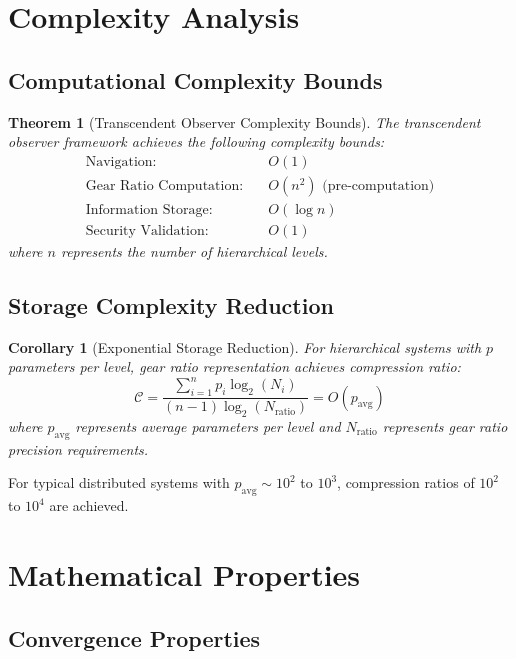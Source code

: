 \documentclass[12pt,a4paper]{article}
\newtheorem{theorem}{Theorem}
\newtheorem{corollary}{Corollary}
\begin{document}
\section{Complexity Analysis}

\subsection{Computational Complexity Bounds}

\begin{theorem}[Transcendent Observer Complexity Bounds]
The transcendent observer framework achieves the following complexity bounds:
\begin{align}
\text{Navigation}: &\quad O(1) \\
\text{Gear Ratio Computation}: &\quad O(n^2) \text{ (pre-computation)} \\
\text{Information Storage}: &\quad O(\log n) \\
\text{Security Validation}: &\quad O(1)
\end{align}
where $n$ represents the number of hierarchical levels.
\end{theorem}

\subsection{Storage Complexity Reduction}

\begin{corollary}[Exponential Storage Reduction]
For hierarchical systems with $p$ parameters per level, gear ratio representation achieves compression ratio:
\begin{equation}
\mathcal{C} = \frac{\sum_{i=1}^{n} p_i \log_2(N_i)}{(n-1) \log_2(N_{\text{ratio}})} = O(p_{\text{avg}})
\end{equation}
where $p_{\text{avg}}$ represents average parameters per level and $N_{\text{ratio}}$ represents gear ratio precision requirements.
\end{corollary}

For typical distributed systems with $p_{\text{avg}} \sim 10^2$ to $10^3$, compression ratios of $10^2$ to $10^4$ are achieved.

\section{Mathematical Properties}

\subsection{Convergence Properties}
\end{document}
